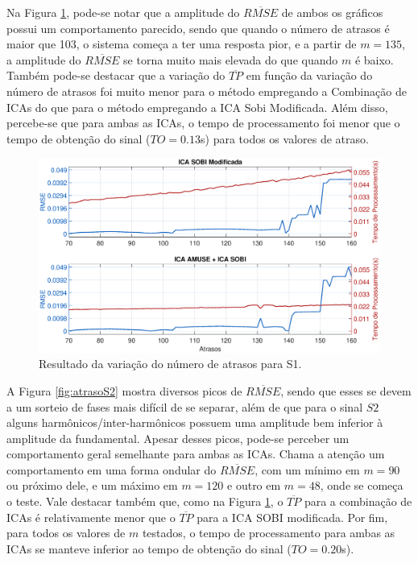 \documentclass[a4paper,12pt]{monografia}
\theoremstyle{plain}
\theoremstyle{definition}
\theoremstyle{remark}
\begin{document}
Na Figura \ref{fig:atrasoS1}, pode-se notar que a amplitude do $\overline{RMSE}$ de ambos os gráficos possui um comportamento parecido, sendo que quando o número de atrasos é maior que 103, o sistema começa a ter uma resposta pior, e a partir de $m=135$, a amplitude do $\overline{RMSE}$ se torna muito mais elevada do que quando $m$ é baixo. Também pode-se destacar que a variação do $\overline{TP}$ em função da variação do número de atrasos foi muito menor para o método empregando a Combinação de ICAs do que para o método empregando a ICA Sobi Modificada. Além disso, percebe-se que para ambas as ICAs, o tempo de processamento foi menor que o tempo de obtenção do sinal ($TO=0.13$s) para todos os valores de atraso.

\begin{figure}[!htb]
    \begin{center}
    \advance\leftskip -1.5cm
    \includegraphics[scale=0.45]{imagens/Sinal1Atrasov2.eps}
    \caption{Resultado da variação do número de atrasos para S1.}
    \label{fig:atrasoS1}
    \end{center}
\end{figure}

A Figura \ref{fig:atrasoS2} mostra diversos picos de $\overline{RMSE}$, sendo que esses se devem a um sorteio de fases mais difícil de se separar, além de que para o sinal $S2$ alguns harmônicos/inter-harmônicos possuem uma amplitude bem inferior à amplitude da fundamental. Apesar desses picos, pode-se perceber um comportamento geral semelhante para ambas as ICAs. Chama a atenção um comportamento em uma forma ondular do $\overline{RMSE}$, com um mínimo em $m=90$ ou próximo dele, e um máximo em $m=120$ e outro em $m=48$, onde se começa o teste. Vale destacar também que, como na Figura \ref{fig:atrasoS1}, o $\overline{TP}$ para a combinação de ICAs é relativamente menor que o $\overline{TP}$ para a ICA SOBI modificada. Por fim, para todos os valores de $m$ testados, o tempo de processamento para ambas as ICAs se manteve inferior ao tempo de obtenção do sinal ($TO=0.20$s).
\end{document}
